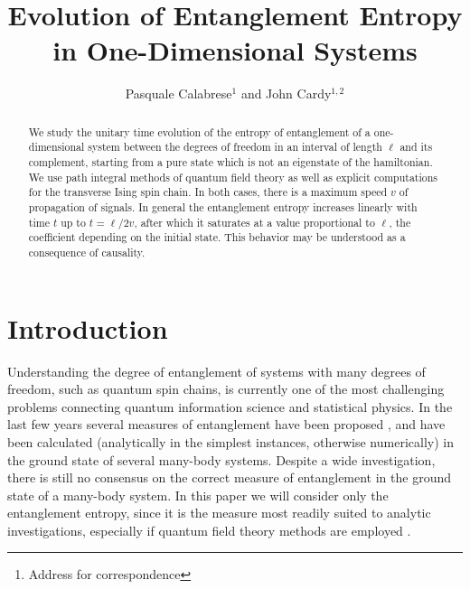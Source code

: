 \documentclass[12pt,preprint,tighten,eqsecnum,aps,floats,psfig,epsfig,amsmath,onecolumn]{revtex4-1}
\begin{document}
%
\title{Evolution of Entanglement Entropy in One-Dimensional Systems}
%
\author{Pasquale Calabrese$^1$ and John Cardy$^{1,2}$}
%
\address{$^1$Rudolf Peierls Centre for Theoretical Physics,
         1 Keble Road, Oxford OX1 3NP, U.K.\footnote{Address for
correspondence} \\
         $^2$All Souls College, Oxford.}

\begin{abstract}

We study the unitary time evolution of the entropy of entanglement of a 
one-dimensional system between the degrees of freedom in an interval of 
length  $\ell$ and its complement, starting from a pure state which is not
an eigenstate of the hamiltonian. 
We use path integral methods of quantum field theory as well as explicit 
computations for the transverse Ising spin chain. 
In both cases, there is a maximum speed $v$ of propagation of signals. 
In general the entanglement entropy increases linearly with time $t$ up 
to $t=\ell/2v$, after which it saturates at a value proportional to $\ell$,
the coefficient depending on the initial state.
This behavior may be understood as a consequence of causality.


\end{abstract}


%
%
\maketitle
%


\newpage





\section{Introduction}


Understanding the degree of entanglement of systems with many degrees 
of freedom, such as quantum spin chains, is currently one of the 
most challenging 
problems connecting quantum information science and statistical physics.
In the last few years several measures of entanglement have been 
proposed \cite{meas,Vidal}, and have been 
calculated (analytically in the simplest
instances, otherwise numerically) in the ground state of several
many-body systems. 
Despite a wide investigation, there is still no consensus 
on the correct measure of entanglement in the ground state of a many-body 
system. In this paper we will consider only the entanglement entropy,
since it is the measure most readily suited to analytic 
investigations, especially if quantum field theory methods 
are employed \cite{cc-04}.
\end{document}
